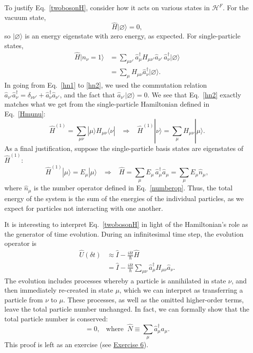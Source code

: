 \documentclass[prx,12pt]{revtex4-2}
\begin{document}
To justify Eq.~\eqref{twobosonH}, consider how it acts on various
states in $\mathscr{H}^F$.  For the vacuum state,
\begin{equation}
  \hat{H}|\varnothing\rangle = 0,
\end{equation}
so $|\varnothing\rangle$ is an energy eigenstate with zero energy, as
expected.  For single-particle states,
\begin{align}
  \hat{H} |n_\nu = 1\rangle
  &= \sum_{\mu\nu'} \hat{a}^\dagger_{\mu} H_{\mu\nu'} \hat{a}_{\nu'}\,
  \hat{a}_\nu^\dagger | \varnothing\rangle \label{hn1} \\
  &= \sum_{\mu} H_{\mu\nu} \hat{a}^\dagger_{\nu} |\varnothing\rangle.
      \label{hn2}
\end{align}
In going from Eq.~\eqref{hn1} to \eqref{hn2}, we used the commutation
relation $\hat{a}_{\nu'} \hat{a}_\nu^\dagger = \delta_{\nu\nu'} +
\hat{a}_\nu^\dagger \hat{a}_{\nu'}$, and the fact that
$\hat{a}_{\nu'}|\varnothing\rangle = 0$.  We see that Eq.~\eqref{hn2}
exactly matches what we get from the single-particle Hamiltonian
defined in Eq.~\eqref{Hmunu}:
\begin{equation}
  \hat{H}^{(1)} = \sum_{\mu\nu} |\mu\rangle H_{\mu\nu} \langle \nu|
  \;\;\;\Rightarrow\;\;\;
  \hat{H}^{(1)} |\nu\rangle = \sum_\mu H_{\mu\nu} |\mu\rangle.
\end{equation}
As a final justification, suppose the single-particle basis states are
eigenstates of $\hat{H}^{(1)}$:
\begin{equation}
  \hat{H}^{(1)}|\mu\rangle = E_\mu |\mu\rangle
  \;\;\;\Rightarrow\;\;\;
  \hat{H} = \sum_{\mu} E_\mu \, \hat{a}^\dagger_\mu \hat{a}_\mu
  = \sum_{\mu} E_\mu \hat{n}_\mu,
\end{equation}
where $\hat{n}_\mu$ is the number operator defined in
Eq.~\eqref{numberop}.  Thus, the total energy of the system is the sum
of the energies of the individual particles, as we expect for
particles not interacting with one another.

It is interesting to interpret Eq.~\eqref{twobosonH} in light of the
Hamiltonian's role as the generator of time evolution.  During an
infinitesimal time step, the evolution operator is
\begin{align}
  \hat{U}(\delta t) &\approx
  \hat{I} - \frac{i \delta t}{\hbar} \hat{H} \\
  &= \hat{I} - \frac{i \delta t}{\hbar} \sum_{\mu\nu} \hat{a}^\dagger_\mu H_{\mu\nu} \hat{a}_\nu.
\end{align}
The evolution includes processes whereby a particle is annihilated in
state $\nu$, and then immediately re-created in state $\mu$, which we
can interpret as transferring a particle from $\nu$ to $\mu$.  These
processes, as well as the omitted higher-order terms, leave the total
particle number unchanged.  In fact, we can formally show that the
total particle number is conserved:
\begin{equation}
  [\hat{H}, \hat{N}] = 0, \;\;\;\mathrm{where}\;\;\hat{N} \equiv \sum_\mu \hat{a}_\mu^\dagger a_\mu.
  \label{Hdiag}
\end{equation}
This proof is left as an exercise (see
\hyperref[ex:n_conserved]{Exercise 6}).
\end{document}
